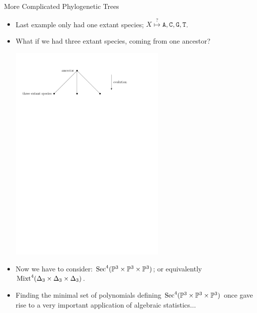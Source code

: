 \begin{frame}{More Complicated Phylogenetic Trees}

    \begin{itemize}
        \item Last example only had one extant species; $X \overset{?}{\longmapsto} \texttt{A}, \texttt{C}, \texttt{G}, \texttt{T}$.

        \item What if we had three extant species, coming from one ancestor?

    \begin{center}
        \includegraphics[width=0.6\textwidth, angle=0]{resources/three-extant.pdf}
    \end{center}

    \item Now we have to consider: $\operatorname{Sec}^{4}(\mathbb{P}^{3} \times \mathbb{P}^{3} \times \mathbb{P}^{3})$; or equivalently $\operatorname{Mixt}^{4}(\Delta_{3} \times \Delta_{3} \times \Delta_{3})$.

    \item Finding the minimal set of polynomials defining $\operatorname{Sec}^{4}(\mathbb{P}^{3} \times \mathbb{P}^{3} \times \mathbb{P}^{3})$ once gave rise to a very important application of algebraic statistics...

    \end{itemize}

\end{frame}

